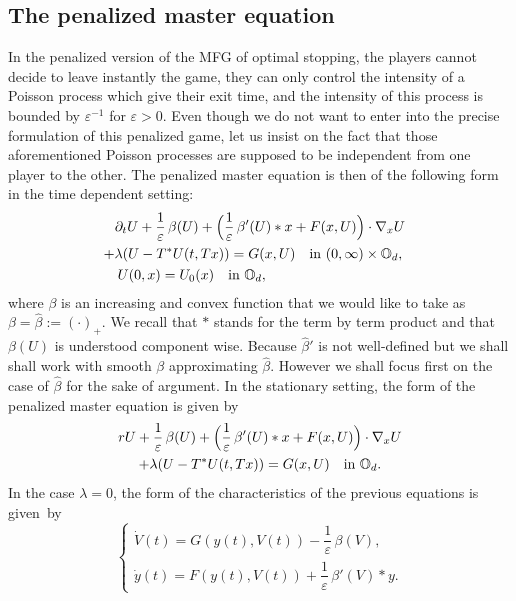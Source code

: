 \documentclass[JEP,XML,SOM,Unicode,NoEqCountersInSection,published]{cedram}
\let\epsilon\varepsilon
\theoremstyle{definition}
\begin{document}
\subsection{The penalized master equation}
In the penalized version of the MFG of optimal stopping, the players cannot decide to leave instantly the game, they can only control the intensity of a Poisson process which give their exit time, and the intensity of this process is bounded by $\epsilon^{-1}$ for $\epsilon > 0$. Even though we do not want to enter into the precise formulation of this penalized game, let us insist on the fact that those aforementioned Poisson processes are supposed to be independent from one player to the other. The penalized master equation is then of the following form in the time dependent setting:
\begin{multline}\label{stopme}
\partial_t U+\frac{1}{\epsilon}\,\beta(U)+\Bigl(\frac{1}{\epsilon}\,\beta'(U)*x+F(x,U)\Bigr)\cdot \nabla_xU\\
\shoveright{+ \lambda (U-T^*U(t,Tx))= G(x,U) \quad\text{in } (0,\infty) \times \mathbb{O}_d,}\\
\shoveleft{U(0,x) = U_0(x) \quad\text{in } \mathbb{O}_d,\hfill}
\end{multline}
where $\beta$ is an increasing and convex function that we would like to take as $\beta = \hat{\beta}:= (\cdot)_+$. We recall that $*$ stands for the term by term product and that $\beta(U)$ is understood component wise. Because $\hat{\beta}'$ is not well-defined but we shall shall work with smooth $\beta$ approximating $\hat{\beta}$. However we shall focus first on the case of $\hat{\beta}$ for the sake of argument. In the stationary setting, the form of the penalized master equation is given by
\begin{multline}\label{stopsme1}
r U+\frac{1}{\epsilon}\,\beta(U)+\Bigl(\frac{1}{\epsilon}\,\beta'(U)*x+F(x,U)\Bigr)\cdot \nabla_xU\\
+\lambda (U-T^*U(t,Tx))= G(x,U) \quad\text{in } \mathbb{O}_d.
\end{multline}
In the case $\lambda = 0$, the form of the characteristics of the previous equations is given~by%
\begin{equation}\label{charstop}
\begin{cases}
\dot{V}(t) = G(y(t),V(t))-\dfrac{1}{\epsilon}\,\beta(V),\\[5pt]
\dot{y}(t) = F(y(t),V(t))+\dfrac{1}{\epsilon}\,\beta'(V)*y.
\end{cases}
\end{equation}
\end{document}
